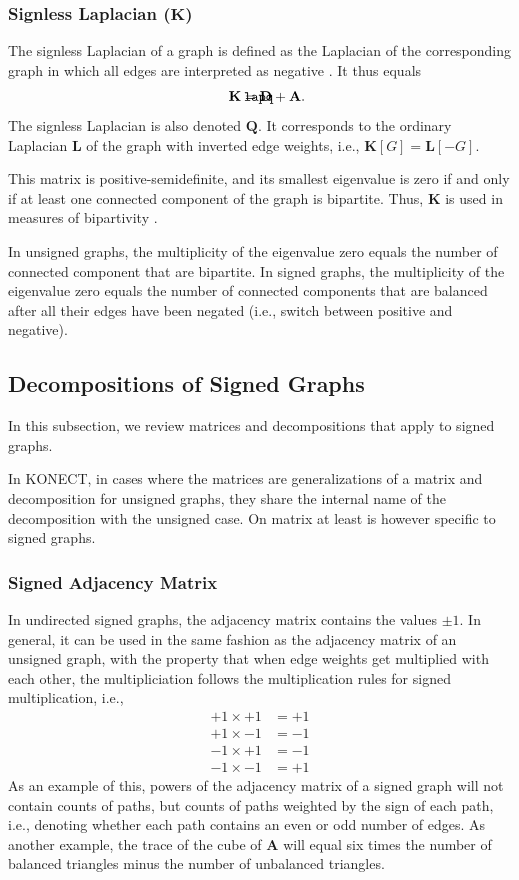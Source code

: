 \documentclass{article}
\def\mathnote#1{%
  \tag*{\rlap{\hspace\marginparsep\smash{\parbox[t]{\marginparwidth}{#1}}}}
}
\begin{document}
\subsubsection{Signless Laplacian ($\mathbf K$)}
\label{sec:signless-laplacian}
The signless Laplacian of a graph is defined as the Laplacian of the
corresponding graph in which all edges are interpreted as negative \citep{b900}.  It
thus equals
\begin{align}
  \mathnote{\texttt{lapq}}
  \mathbf K &= \mathbf D + \mathbf A.
\end{align}
The signless Laplacian is also denoted $\mathbf Q$. 
It corresponds to the ordinary Laplacian
$\mathbf L$ of the graph with inverted edge weights, i.e., $\mathbf K[G] =
\mathbf L[-G]$. 

This matrix is positive-semidefinite, and its smallest eigenvalue is
zero if and only if at least one connected component of the graph is bipartite.  Thus, $\mathbf K$ is used
in measures of bipartivity \citep[see e.g.][]{kunegis:bipartivity}. 

In unsigned graphs, the multiplicity of the eigenvalue zero equals the
number of connected component that are bipartite.  
In signed graphs, the multiplicity of the eigenvalue zero equals the
number of connected components that are balanced after all their edges
have been negated (i.e., switch between positive and negative). 

\subsection{Decompositions of Signed Graphs}
In this subsection, we review matrices and decompositions that apply to
signed graphs.  

In KONECT, in cases where the matrices are generalizations of a matrix and
decomposition for unsigned graphs, they share the internal name of the
decomposition with the unsigned case.  On matrix at least is however
specific to signed graphs. 

\subsubsection{Signed Adjacency Matrix}
In undirected signed graphs, the adjacency matrix contains the values
$\pm 1$.  In general, it can be used in the same fashion as the
adjacency matrix of an unsigned graph, with the property that when edge
weights get multiplied with each other, the multipliciation follows the
multiplication rules for signed multiplication, i.e., 
\begin{align*}
  +1 \times +1 &= +1 \\
  +1 \times -1 &= -1 \\
  -1 \times +1 &= -1 \\
  -1 \times -1 &= +1 
\end{align*}
As an example of this, powers of the adjacency matrix of a signed graph
will not contain counts of paths, but counts of paths weighted by the
sign of each path, i.e., denoting whether each path contains an even or
odd number of edges.  As another example, the trace of the cube of
$\mathbf A$ will equal six times the number of balanced triangles minus
the number of unbalanced triangles. 
\end{document}
